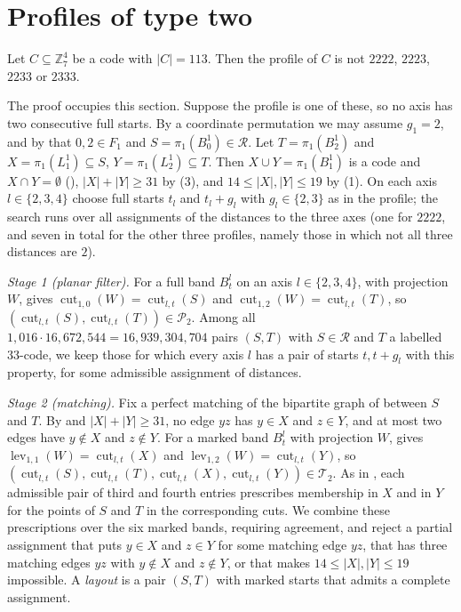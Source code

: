 \documentclass[11pt,colorlinks]{charlie}
\newcommand{\Zs}{\mathbb{Z}_7}
\newcommand{\cut}{\operatorname{cut}}
\newcommand{\lev}{\operatorname{lev}}
\newcommand{\cR}{\mathcal{R}}
\begin{document}
\section{Profiles of type two}\label{sec:gaptwo}
\begin{proposition}\label{prop:gaptwo}
Let $C\subseteq\Zs^4$ be a code with $|C|=113$. Then the profile of $C$ is not $2222$, $2223$, $2233$ or $2333$.
\end{proposition}

The proof occupies this section. Suppose the profile is one of these, so no axis has two consecutive full starts. By a coordinate permutation we may assume $g_1=2$, and by  that $0,2\in F_1$ and $S=\pi_1(B^1_0)\in\cR$. Let $T=\pi_1(B^1_2)$ and $X=\pi_1(L^1_1)\subseteq S$, $Y=\pi_1(L^1_2)\subseteq T$. Then $X\cup Y=\pi_1(B^1_1)$ is a code and $X\cap Y=\emptyset$ (), $|X|+|Y|\ge31$ by (3), and $14\le|X|,|Y|\le19$ by (1). On each axis $l\in\{2,3,4\}$ choose full starts $t_l$ and $t_l+g_l$ with $g_l\in\{2,3\}$ as in the profile; the search runs over all assignments of the distances to the three axes (one for $2222$, and seven in total for the other three profiles, namely those in which not all three distances are $2$).

\emph{Stage 1 (planar filter).} For a full band $B^l_t$ on an axis $l\in\{2,3,4\}$, with projection $W$,  gives $\cut_{1,0}(W)=\cut_{l,t}(S)$ and $\cut_{1,2}(W)=\cut_{l,t}(T)$, so $(\cut_{l,t}(S),\cut_{l,t}(T))\in\mathcal P_2$. Among all $1{,}016\cdot16{,}672{,}544=16{,}939{,}304{,}704$ pairs $(S,T)$ with $S\in\cR$ and $T$ a labelled $33$-code, we keep those for which every axis $l$ has a pair of starts $t,t+g_l$ with this property, for some admissible assignment of distances.

\emph{Stage 2 (matching).} Fix a perfect matching of the bipartite graph of  between $S$ and $T$. By  and $|X|+|Y|\ge31$, no edge $yz$ has $y\in X$ and $z\in Y$, and at most two edges have $y\notin X$ and $z\notin Y$. For a marked band $B^l_t$ with projection $W$,  gives $\lev_{1,1}(W)=\cut_{l,t}(X)$ and $\lev_{1,2}(W)=\cut_{l,t}(Y)$, so $(\cut_{l,t}(S),\cut_{l,t}(T),\cut_{l,t}(X),\cut_{l,t}(Y))\in\mathcal T_2$. As in , each admissible pair of third and fourth entries prescribes membership in $X$ and in $Y$ for the points of $S$ and $T$ in the corresponding cuts. We combine these prescriptions over the six marked bands, requiring agreement, and reject a partial assignment that puts $y\in X$ and $z\in Y$ for some matching edge $yz$, that has three matching edges $yz$ with $y\notin X$ and $z\notin Y$, or that makes $14\le|X|,|Y|\le19$ impossible. A \emph{layout} is a pair $(S,T)$ with marked starts that admits a complete assignment.
\end{document}
